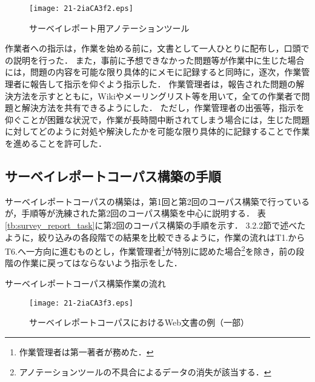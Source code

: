 \documentclass[japanese]{jnlp_1.4}
\begin{document}
\begin{figure}[t]
\begin{center}
\texttt{[image: 21-2iaCA3f2.eps]}
\end{center}
\caption{サーベイレポート用アノテーションツール}
\label{fg:SR_tool}
\end{figure}

{作業者}への指示は，作業を始める前に，文書として一人ひとりに配布し，口頭での説明を行った．
また，事前に予想できなかった問題等が作業中に生じた場合には，問題の内容を可能な限り具体的にメモに記録すると同時に，逐次，作業管理者に報告して指示を仰ぐよう指示した．
作業管理者は，報告された問題の解決方法を示すとともに，Wikiやメーリングリスト等を用いて，全ての作業者で問題と解決方法を共有できるようにした．
ただし，作業管理者の出張等，指示を仰ぐことが困難な状況で，作業が長時間中断されてしまう場合には，生じた問題に対してどのように対処や解決したかを可能な限り具体的に記録することで作業を進めることを許可した．


\subsection{サーベイレポートコーパス構築の手順}
\label{ssc:survey_report_step}

サーベイレポートコーパスの構築は，第1回と第2回のコーパス構築で行っているが，手順等が洗練された第2回のコーパス構築を中心に説明する．
表\ref{tb:survey_report_task}に第2回のコーパス構築の手順を示す．
3.2.2節で述べたように，絞り込みの各段階での結果を比較できるように，作業の流れはT1.からT6.へ一方向に進むものとし，作業管理者\footnote{作業管理者は第一著者が務めた．}が特別に認めた場合\footnote{アノテーションツールの不具合によるデータの消失が該当する．}を除き，前の段階の作業に戻ってはならないよう指示をした．

\begin{table}[t]
 \caption{サーベイレポートコーパス構築作業の流れ}
 \label{tb:survey_report_task}

\end{table}
\begin{figure}[t]
\begin{center}
\texttt{[image: 21-2iaCA3f3.eps]}
\end{center}
 \caption{サーベイレポートコーパスにおけるWeb文書の例（一部）}
 \label{fg:SR_webdoc}
\end{figure}
\end{document}
